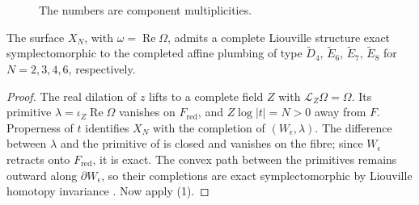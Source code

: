 \documentclass[a4paper]{amsart}
\DeclareMathOperator{\Ree}{Re}
\newcommand{\m}{\mathfrak{m}}
\numberwithin{equation}{section}
\begin{document}
\begin{figure}[ht]
\centering
{}
\caption{The numbers are component multiplicities.}
\label{fig:quotients}
\end{figure}

\begin{proposition}\label{prop:quotients}
The surface $X_N$, with $\omega=\Ree\Omega$, admits a
complete Liouville structure exact symplectomorphic to the completed
affine plumbing of type $\widetilde D_4$, $\widetilde E_6$,
$\widetilde E_7$, $\widetilde E_8$ for $N=2,3,4,6$, respectively.
\end{proposition}

\begin{proof}
The real dilation of $z$ lifts to a complete field $Z$ with
$\mathcal L_Z\Omega=\Omega$. Its primitive
$\lambda=\iota_Z\Ree\Omega$ vanishes on $F_{\mathrm{red}}$, and
$Z\log|t|=N>0$ away from $F$. Properness of $t$ identifies $X_N$
with the completion of $(W_\epsilon,\lambda)$. The difference
between $\lambda$ and the primitive of
 is closed and vanishes on the
fibre; since $W_\epsilon$ retracts onto $F_{\mathrm{red}}$, it is
exact. The convex path between the primitives remains outward
along $\partial W_\epsilon$, so their completions are exact
symplectomorphic by Liouville homotopy invariance \cite{CE}.
Now apply (1).
\end{proof}
\end{document}
